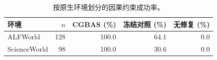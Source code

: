 \begin{table}[t]
\centering
\small
\caption{按原生环境划分的因果约束成功率。}
\begin{tabular}{lrrrr}
\toprule
环境 & $n$ & CGBAS (\%) & 冻结对照 (\%) & 无修复 (\%) \\
\midrule
ALFWorld & 128 & 100.0 & 64.1 & 0.0 \\
ScienceWorld & 98 & 100.0 & 30.6 & 0.0 \\
\bottomrule
\end{tabular}
\end{table}
